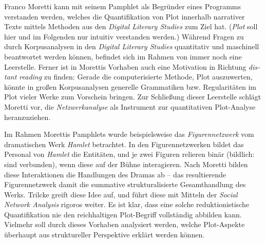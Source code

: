 \documentclass[a4paper,10pt,abstract=true,headings=small]{scrartcl}
\newcommand{\eng}[1]{\textenglish{\emph{#1}}}
\begin{document}
Franco Moretti kann mit seinem Pamphlet \autocite{moretti_network_2011} als Begründer eines Programms verstanden werden, welches die Quantifikation von Plot innerhalb narrativer Texte mittels Methoden aus den \eng{Digital Literary Studies} zum Ziel hat.
(\emph{Plot} soll hier und im Folgenden nur intuitiv verstanden werden.)
Während Fragen zu \textquote{\eng{language and style}} durch Korpusanalysen in den \emph{Digital Literary Studies} quantitativ und maschinell beantwortet werden können, befindet sich im Rahmen von \textquote{\eng{plot}} immer noch eine Leerstelle. %
Ferner ist in Morettis Vorhaben auch eine Motivation in Richtung \eng{distant reading} zu finden: Gerade die computerisierte Methode, Plot auszuwerten, könnte in großen Korpusanalysen generelle Grammatiken bzw. Regularitäten im Plot vieler Werke zum Vorschein bringen. %
Zur Schließung dieser Leerstelle schlägt Moretti vor, die \emph{Netzwerkanalyse} als Instrument zur quantitativen Plot-Analyse heranzuziehen.\autocites[Vgl.][]{moretti_network_2011}[Vgl.][]{trilcke_small_2020}

Im Rahmen Morettis Pamphlets wurde beispielsweise das \emph{Figurennetzwerk} vom dramatischen Werk \emph{Hamlet} betrachtet.
In den Figurennetzwerken bildet das Personal von \emph{Hamlet} die Entitäten, und je zwei Figuren relieren binär (bildlich: sind verbunden), wenn diese auf der Bühne interagieren.\autocite[Siehe z.\,B.][13, Abbildung 1]{moretti_network_2011}
Nach Moretti bilden diese Interaktionen die Handlungen des Dramas ab – das resultierende Figurennetzwerk damit die summative strukturalisierte Gesamthandlung des Werks.
Trilcke greift diese Idee auf, und führt diese mit Mitteln der \emph{Social Network Analysis} rigoros weiter.\autocite{trilcke_social_2013} %
Es ist klar, dass eine solche reduktionistische Quantifikation nie den reichhaltigen Plot-Begriff vollständig abbilden kann.
Vielmehr soll durch dieses Vorhaben analysiert werden, welche Plot-Aspekte überhaupt aus struktureller Perspektive erklärt werden können.\autocite[Vgl.][176]{trilcke_netzwerkdynamik_2017}
\end{document}
